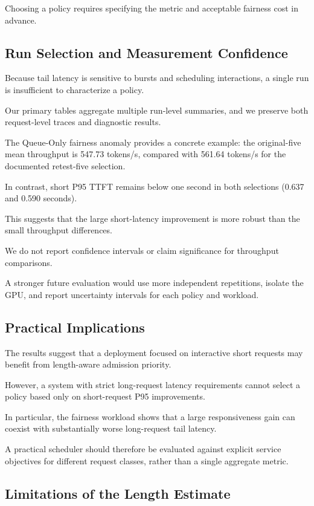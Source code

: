 \documentclass[sigplan,nonacm]{acmart}
\begin{document}
Choosing a policy requires specifying
the metric and acceptable fairness
cost in advance.

\subsection{Run Selection and Measurement Confidence}

Because tail latency is sensitive to
bursts and scheduling interactions,
a single run is insufficient to
characterize a policy.

Our primary tables aggregate multiple
run-level summaries, and we preserve
both request-level traces and
diagnostic results.

The Queue-Only fairness anomaly
provides a concrete example:
the original-five mean throughput
is 547.73 tokens/s, compared with
561.64 tokens/s for the documented
retest-five selection.

In contrast, short P95 TTFT remains
below one second in both selections
(0.637 and 0.590 seconds).

This suggests that the large
short-latency improvement is more
robust than the small throughput
differences.

We do not report confidence intervals
or claim significance for throughput
comparisons.

A stronger future evaluation would
use more independent repetitions,
isolate the GPU, and report uncertainty
intervals for each policy and workload.

\subsection{Practical Implications}

The results suggest that a deployment
focused on interactive short requests
may benefit from length-aware admission
priority.

However, a system with strict
long-request latency requirements
cannot select a policy based only
on short-request P95 improvements.

In particular, the fairness workload
shows that a large responsiveness gain
can coexist with substantially worse
long-request tail latency.

A practical scheduler should therefore
be evaluated against explicit service
objectives for different request classes,
rather than a single aggregate metric.

\subsection{Limitations of the Length Estimate}
\end{document}
